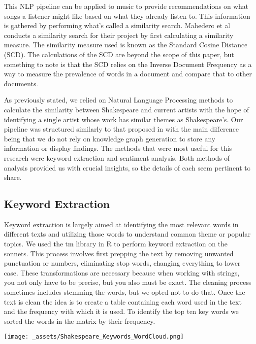 \documentclass[10pt,a4paper]{article}
\begin{document}
\noindent This NLP pipeline can be applied to music to provide recommendations on what songs a listener might like based on what they already listen to. \cite{NLP-for-lyrics} This information is gathered by performing what’s called a similarity search. Mahedero et al \cite{NLP-for-lyrics} conducts a similarity search for their project by first calculating a similarity measure. The similarity measure used is known as the Standard Cosine Distance (SCD). The calculations of the SCD are beyond the scope of this paper, but something to note is that the SCD relies on the Inverse Document Frequency as a way to measure the prevalence of words in a document and compare that to other documents. 

\noindent As previously stated, we relied on Natural Language Processing methods to calculate the similarity between Shakespeare and current artists with the hope of identifying a single artist whose work has similar themes as Shakespeare’s. Our pipeline was structured similarly to that proposed in \cite{NLP-for-music} with the main difference being that we do not rely on knowledge graph generation to store any information or display findings. The methods that were most useful for this research were keyword extraction and sentiment analysis. Both methods of analysis provided us with crucial insights, so the details of each seem pertinent to share. 

\subsection{Keyword Extraction}
Keyword extraction is largely aimed at identifying the most relevant words in different texts and utilizing those words to understand common theme or popular topics.\cite{monkey} We used the tm library in R to perform keyword extraction\cite{tm} on the sonnets. This process involves first prepping the text by removing unwanted punctuation or numbers, eliminating stop words, changing everything to lower case. These transformations are necessary because when working with strings, you not only have to be precise, but you also must be exact. The cleaning process sometimes includes stemming the words, but we opted not to do that. Once the text is clean the idea is to create a table containing each word used in the text and the frequency with which it is used. To identify the top ten key words we sorted the words in the matrix by their frequency. 

\begin{center}
\texttt{[image: \_assets/Shakespeare\_Keywords\_WordCloud.png]}
\end{center}
\end{document}
